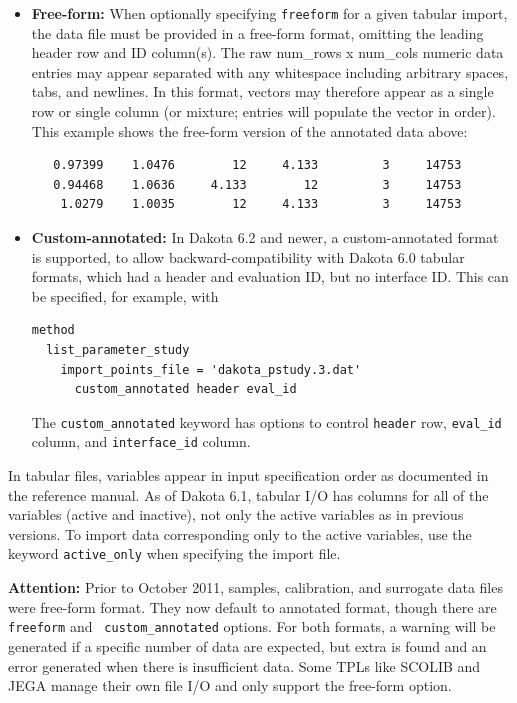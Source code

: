 \begin{itemize}
\item \textbf{Free-form:} When optionally specifying \texttt{freeform}
  for a given tabular import, the data file must be provided in a
  free-form format, omitting the leading header row and ID
  column(s). The raw num\_rows x num\_cols numeric data entries may
  appear separated with any whitespace including arbitrary spaces,
  tabs, and newlines.  In this format, vectors may therefore appear as
  a single row or single column (or mixture; entries will populate the
  vector in order).  This example shows the free-form version of the
  annotated data above:
\begin{verbatim}
   0.97399    1.0476        12     4.133         3     14753 
   0.94468    1.0636     4.133        12         3     14753 
    1.0279    1.0035        12     4.133         3     14753 
\end{verbatim}

\item \textbf{Custom-annotated:} In Dakota 6.2 and newer, a
  custom-annotated format is supported, to allow
  backward-compatibility with Dakota 6.0 tabular formats, which had a
  header and evaluation ID, but no interface ID.  This can be
  specified, for example, with
\begin{verbatim}
method
  list_parameter_study
    import_points_file = 'dakota_pstudy.3.dat'
      custom_annotated header eval_id
\end{verbatim}
  The \texttt{custom\_annotated} keyword has options to control
  \texttt{header} row, \texttt{eval\_id} column, and
  \texttt{interface\_id} column.

\end{itemize}

In tabular files, variables appear in input specification order as
documented in the reference manual.  As of Dakota 6.1, tabular I/O has
columns for all of the variables (active and inactive), not only the
active variables as in previous versions.  To import data
corresponding only to the active variables, use the keyword
\texttt{active\_only} when specifying the import file.

{\bf Attention:} Prior to October 2011, samples, calibration, and
surrogate data files were free-form format.  They now default to
annotated format, though there are {\tt freeform} and {\tt
  custom\_annotated} options.  For both formats, a warning will be
generated if a specific number of data are expected, but extra is
found and an error generated when there is insufficient data.  Some
TPLs like SCOLIB and JEGA manage their own file I/O and only support
the free-form option.


